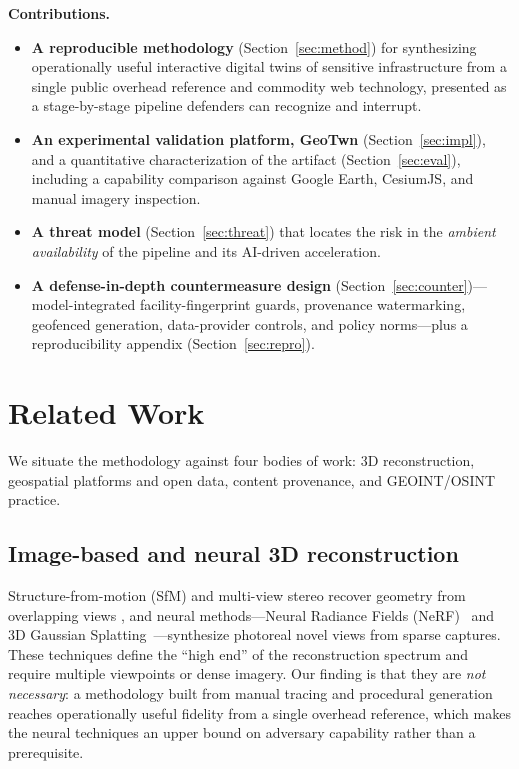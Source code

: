 \documentclass[conference]{IEEEtran}
\begin{document}
\textbf{Contributions.}
\begin{itemize}
\item \textbf{A reproducible methodology} (Section~\ref{sec:method}) for
synthesizing operationally useful interactive digital twins of sensitive
infrastructure from a single public overhead reference and commodity web
technology, presented as a stage-by-stage pipeline defenders can recognize and
interrupt.
\item \textbf{An experimental validation platform, GeoTwn}
(Section~\ref{sec:impl}), and a quantitative characterization of the artifact
(Section~\ref{sec:eval}), including a capability comparison against Google Earth,
CesiumJS, and manual imagery inspection.
\item \textbf{A threat model} (Section~\ref{sec:threat}) that locates the risk in
the \emph{ambient availability} of the pipeline and its AI-driven acceleration.
\item \textbf{A defense-in-depth countermeasure design}
(Section~\ref{sec:counter})---model-integrated facility-fingerprint guards,
provenance watermarking, geofenced generation, data-provider controls, and policy
norms---plus a reproducibility appendix (Section~\ref{sec:repro}).
\end{itemize}

\section{Related Work}
\label{sec:related}
We situate the methodology against four bodies of work: 3D reconstruction,
geospatial platforms and open data, content provenance, and GEOINT/OSINT
practice.

\subsection{Image-based and neural 3D reconstruction}
Structure-from-motion (SfM) and multi-view stereo recover geometry from
overlapping views \cite{sfm}, and neural methods---Neural Radiance Fields
(NeRF)~\cite{nerf} and 3D Gaussian Splatting~\cite{gsplat}---synthesize photoreal
novel views from sparse captures. These techniques define the ``high end'' of the
reconstruction spectrum and require multiple viewpoints or dense imagery. Our
finding is that they are \emph{not necessary}: a methodology built from manual
tracing and procedural generation reaches operationally useful fidelity from a
single overhead reference, which makes the neural techniques an upper bound on
adversary capability rather than a prerequisite.
\end{document}
